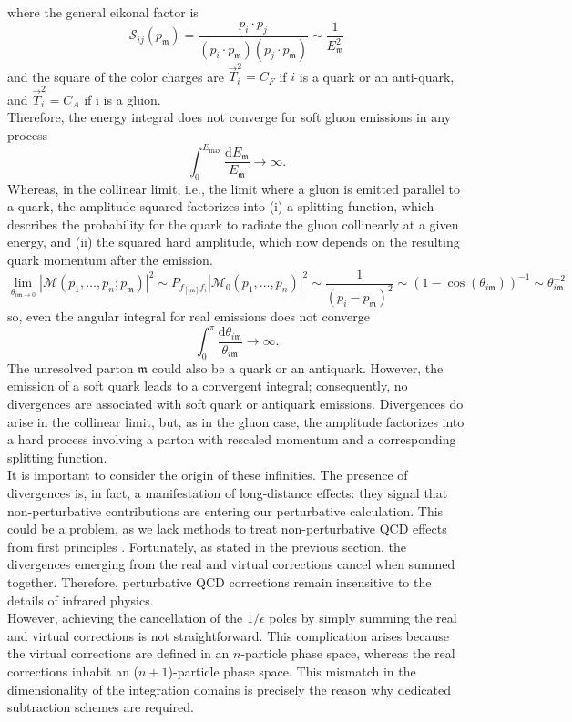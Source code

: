 \documentclass[a4paper, 12pt]{book}
\newcommand{\um}{\mathfrak{m}}
\begin{document}
where the general eikonal factor is
\begin{equation}
    \mathcal{S}_{ij}(p_\um) = \frac{p_i \cdot p_j}{(p_i \cdot p_\um)(p_j \cdot p_\um)} \sim \frac{1}{E_\um^2}
\end{equation}
and the square of the color charges are $\vec{T}_i^2= C_F$ if $i$ is a quark or an anti-quark, and $\vec{T}_i^2= C_A$ if i is a gluon. \\
Therefore, the energy integral does not converge for soft gluon emissions in any process
\begin{equation}
    \int_0^{E_{\mathrm{max}}} \frac{\mathrm{d}E_\um}{E_\um} \rightarrow \infty.
\end{equation}
Whereas, in the collinear limit, i.e., the limit where a gluon is emitted parallel to a quark, the amplitude-squared factorizes into (i) a splitting function, which describes the probability for the quark to radiate the gluon collinearly at a given energy, and (ii) the squared hard amplitude, which now depends on the resulting quark momentum after the emission.
\begin{equation}
    \lim_{\theta_{i \um \rightarrow 0}}|\mathcal{M}(p_1, \dots, p_n; p_\um)|^2 \sim P_{f_{[i\um]}f_i} |\mathcal{M}_0(p_1, \dots, p_n)|^2 \sim \frac{1}{(p_i-p_\um)^2} \sim (1-\cos(\theta_{i\um}))^{-1}\sim \theta_{i\um}^{-2}
\end{equation}
so, even the angular integral for real emissions does not converge
\begin{equation}
    \int_0^{\pi} \frac{\mathrm{d}\theta_{i\um}}{{\theta_{i\um}}} \rightarrow \infty.
\end{equation}
The unresolved parton $\um$ could also be a quark or an antiquark. However, the emission of a soft quark leads to a convergent integral; consequently, no divergences are associated with soft quark or antiquark emissions. Divergences do arise in the collinear limit, but, as in the gluon case, the amplitude factorizes into a hard process involving a parton with rescaled momentum and a corresponding splitting function. \\
It is important to consider the origin of these infinities. The presence of divergences is, in fact, a manifestation of long-distance effects: they signal that non-perturbative contributions are entering our perturbative calculation. This could be a problem, as we lack methods to treat non-perturbative QCD effects from first principles \cite{Melnikov2018}. Fortunately, as stated in the previous section, the divergences emerging from the real and virtual corrections cancel when summed together. Therefore, perturbative QCD corrections remain insensitive to the details of infrared physics. \\
However, achieving the cancellation of the $1/\epsilon$ poles by simply summing the real and virtual corrections is not straightforward. This complication arises because the virtual corrections are defined in an $n$-particle phase space, whereas the real corrections inhabit an ($n+1$)-particle phase space. This mismatch in the dimensionality of the integration domains is precisely the reason why dedicated subtraction schemes are required.
\end{document}
